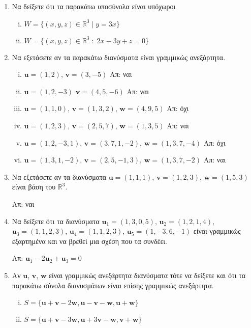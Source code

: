 \begin{enumerate}
    \item Να δείξετε ότι τα παρακάτω υποσύνολα είναι υπόχωροι
        \begin{enumerate}[(i)]
            \item $ W = \{ (x,y,z) \in \mathbb{R}^{3} \mid y = 3x \} $ 
            \item $ W = \{(x,y,z)\in \mathbb{R}^{3} \; : \; 2x-3y+z=0 \} $
        \end{enumerate}

    \item Να εξετάσετε αν τα παρακάτω διανύσματα είναι γραμμικώς ανεξάρτητα.
        \begin{enumerate}[(i)]
            \item $ \mathbf{u} = (1,2) $, $ \mathbf{v} = (3,-5) $ \hfill Απ: ναι
            \item $ \mathbf{u} = (1,2,-3) $ $ \mathbf{v} = (4,5,-6) $ \hfill Απ: ναι
            \item $ \mathbf{u} = (1,1,0)$, $ \mathbf{v} = (1,3,2)$, $ \mathbf{w} = (4,9,5) $ \hfill Απ: όχι 
            \item $ \mathbf{u} = (1,2,3)$, $ \mathbf{v} = (2,5,7)$, $ \mathbf{w} = (1,3,5) $ \hfill Απ: ναι 
            \item $ \mathbf{u} = (1,2,-3,1) $, $ \mathbf{v} = (3,7,1,-2) $, $ \mathbf{w} =
                (1,3,7,-4) $ \hfill Απ: όχι
            \item $ \mathbf{u} = (1,3,1,-2) $, $ \mathbf{v} = (2,5,-1,3) $, $ \mathbf{w} =
                (1,3,7,-2) $ \hfill Απ: ναι
        \end{enumerate}

    \item Να εξετάσετε αν τα διανύσματα $ \mathbf{u} = (1,1,1)$, $ \mathbf{v} = (1,2,3)$, $
        \mathbf{w} = (1,5,3) $ είναι βάση του $\mathbb{R}^{3}$. 

        \hfill Απ: ναι 

    \item Να δείξετε ότι τα διανύσματα $ \mathbf{u}_{1} = (1,3,0,5) $, $ \mathbf{u}_{2} = (1,2,1,4)
        $, $ \mathbf{u}_{3} = (1,1,2,3)$, $ \mathbf{u}_{4} = (1,1,2,3) $, $ \mathbf{u}_{5} =
        (1,-3,6,-1) $ είναι γραμμικώς εξαρτημένα και να βρεθεί μια σχέση που τα συνδέει. 

        \hfill Απ: $ \mathbf{u}_{1} - 2 \mathbf{u}_{2} + \mathbf{u}_{3} = 0 $ 

    \item Αν $ \mathbf{u} $, $ \mathbf{v} $, $ \mathbf{w} $ είναι γραμμικώς ανεξάρτητα διανύσματα
        τότε να δείξετε και ότι τα παρακάτω σύνολα διανυσμάτων είναι επίσης γραμμικώς ανεξάρτητα.
        \begin{enumerate}[(i)]
            \item $ S = \{ \mathbf{u} + \mathbf{v} - 2 \mathbf{w}, \mathbf{u} - \mathbf{v} -
                \mathbf{w}, \mathbf{u} + \mathbf{w} \} $
            \item $ S = \{ \mathbf{u} + \mathbf{v} - 3 \mathbf{w}, \mathbf{u} + 3 \mathbf{v} -
                \mathbf{w}, \mathbf{v} + \mathbf{w}\}  $
        \end{enumerate}



\end{enumerate}

